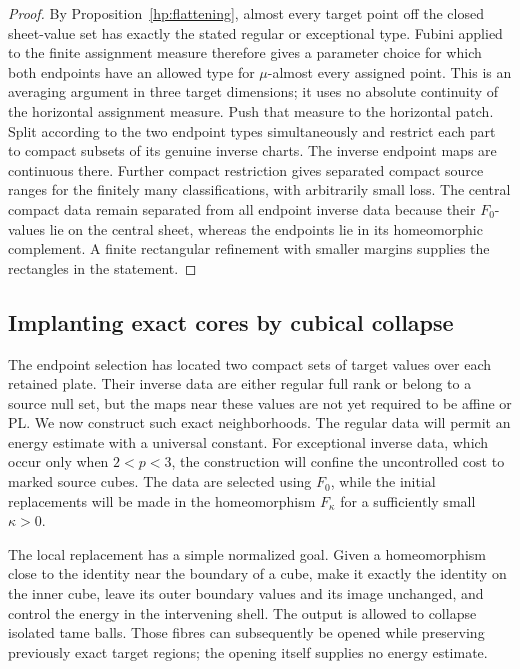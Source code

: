 \documentclass[11pt]{article}
\numberwithin{equation}{section}
\theoremstyle{definition}
\theoremstyle{remark}
\begin{document}
\begin{proof}
By Proposition~\ref{hp:flattening}, almost every target point off the
closed sheet-value set has exactly the stated regular or exceptional
type.  Fubini applied to the finite assignment measure therefore gives
a parameter choice for which both endpoints have an allowed type for
$\mu$-almost every assigned point.  This is an averaging argument in
three target dimensions; it uses no absolute continuity of the
horizontal assignment measure.  Push that measure to the horizontal
patch.  Split according to the two endpoint types simultaneously and
restrict each part to compact subsets of its genuine inverse charts.
The inverse endpoint maps are continuous there.  Further compact
restriction gives separated compact source ranges for the finitely
many classifications, with arbitrarily small loss.  The central
compact data remain separated from all endpoint inverse data because
their $F_0$-values lie on the central sheet, whereas the endpoints lie
in its homeomorphic complement.  A finite rectangular refinement
with smaller margins supplies the rectangles in the statement.
\end{proof}

\subsection{Implanting exact cores by cubical collapse}

The endpoint selection has located two compact sets of target values
over each retained plate.  Their inverse data are either regular full
rank or belong to a source null set, but the maps near these values are
not yet required to be affine or PL.  We now construct such exact
neighborhoods.  The regular data will permit an energy estimate with a
universal constant.  For exceptional inverse data, which occur only
when $2<p<3$, the construction will confine the uncontrolled cost to
marked source cubes.  The data are selected using $F_0$, while the
initial replacements will be made in the homeomorphism $F_\kappa$
for a sufficiently small $\kappa>0$.

The local replacement has a simple normalized goal.  Given a
homeomorphism close to the identity near the boundary of a cube, make
it exactly the identity on the inner cube, leave its outer boundary
values and its image unchanged, and control the energy in the
intervening shell.  The output is allowed to collapse isolated tame
balls.  Those fibres can subsequently be opened while preserving
previously exact target regions; the opening itself supplies no energy
estimate.
\end{document}
